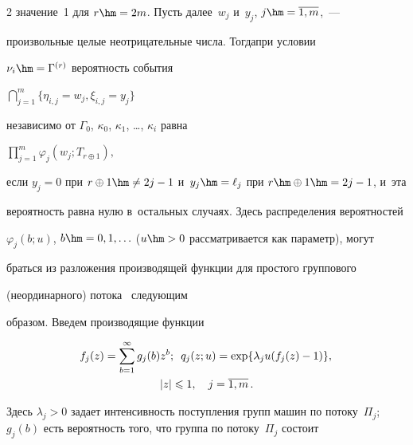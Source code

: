 \begin{multicols}{2}
значение~1 для $r\hm=2m$. Пусть далее~$w_j$ и~$y_j$, $j\hm=\overline{1, m}$,~---

произ\-вольные целые неотрицательные числа. Тогда\linebreak при условии

$\nu_{i}\hm=\Gamma^{(r)}$ вероятность события



$\bigcap\nolimits_{j=1}^m \{ \eta_{i,j}=w_j, \xi_{i,j}=y_j\}

$ %

независимо от $\Gamma_0$, $\kappa_0$, $\kappa_1$, \ldots, $\kappa_{i}$ равна

$

\prod\nolimits_{j=1}^m \varphi_j(w_j; T_{r\oplus1}),

$

если $y_j=0$ при $r\oplus1\hm\neq 2j-1$ и~$y_j\hm=\ell_j$ при $r\hm \oplus1\hm=2j-1$, и~эта

вероятность равна нулю в~остальных случаях. Здесь распределения вероятностей

$\varphi_j(b;u)$, $b\hm=0, 1, \ldots$ ($u\hm>0$ рассматривается как параметр), могут

браться из разложения производящей функции для простого группового

(неординарного) потока~\cite{Ivchenko:Kashtanov:Kovalenko} следующим

образом. Введем производящие функции



\vspace*{-6pt}



\noindent

\begin{multline*}

\!f_j(z)=\sum\limits_{b=1}^\infty g_j(b) z^b;

\enskip

q_j(z;u)= \exp\{ \lambda_j u (

f_j(z) -1) \},\\  |z|\leqslant1,\quad j=\overline{1,  m}\,.

\end{multline*}

Здесь $\lambda_j>0$ задает интенсивность поступления групп машин по потоку~$\Pi_j$; $g_j(b)$ есть вероятность того, что группа по потоку~$\Pi_j$ состоит


\end{multicols}
